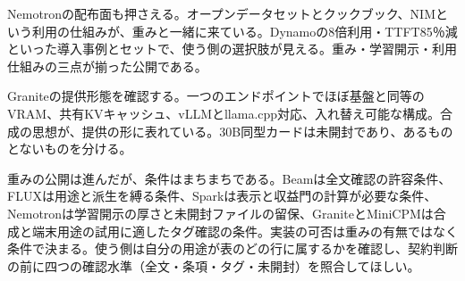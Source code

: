 \documentclass[lualatex,a4paper,10pt]{jlreq}
\begin{document}
Nemotronの配布面も押さえる。オープンデータセットとクックブック、NIMという利用の仕組みが、重みと一緒に来ている。Dynamoの8倍利用・TTFT85％減といった導入事例とセットで、使う側の選択肢が見える。重み・学習開示・利用仕組みの三点が揃った公開である。

Graniteの提供形態を確認する。一つのエンドポイントでほぼ基盤と同等のVRAM、共有KVキャッシュ、vLLMとllama.cpp対応、入れ替え可能な構成。合成の思想が、提供の形に表れている。30B同型カードは未開封であり、あるものとないものを分ける。

重みの公開は進んだが、条件はまちまちである。Beamは全文確認の許容条件、FLUXは用途と派生を縛る条件、Sparkは表示と収益門の計算が必要な条件、Nemotronは学習開示の厚さと未開封ファイルの留保、GraniteとMiniCPMは合成と端末用途の試用に適したタグ確認の条件。実装の可否は重みの有無ではなく条件で決まる。使う側は自分の用途が表のどの行に属するかを確認し、契約判断の前に四つの確認水準（全文・条項・タグ・未開封）を照合してほしい。
\end{document}
